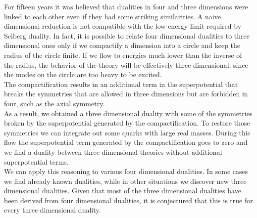 For fifteen years it was believed that dualities in four and three dimensions were linked to each other even if they had some striking similarities. 
A naive dimensional reduction is not compatible with the low-energy limit required by Seiberg duality.  
In fact, it is possible to relate four dimensional dualities to three dimensional ones only if we compactify a dimension into a circle and keep the radius of the circle finite. 
If we flow to energies much lower than the inverse of the radius, the behavior of the theory will be effectively three dimensional, since the modes on the circle are too heavy to be excited.\\
The compactification results in an additional term in the superpotential that breaks the symmetries that are allowed in three dimensions but are forbidden in four, such as the axial symmetry.\\
As a result, we obtained a three dimensional duality with some of the symmetries broken by the superpotential generated by the compactification. 
To restore those symmetries we can integrate out some quarks with large real masses. During this flow the superpotential term generated by the compactification goes to zero and we find a duality between three dimensional theories without additional superpotential terms.\\
We can apply this reasoning to various four dimensional dualities. 
In some cases we find already known dualities, while in other situations we discover new three dimensional dualities. 
Given that most of the three dimensional dualities have been derived from four dimensional dualities, it is conjectured that this is true for every three dimensional duality.\\

